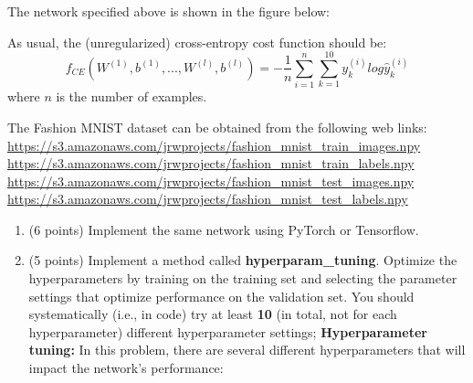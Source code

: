 \documentclass[
  letterpaper,
  DIV=11,
  numbers=noendperiod]{scrartcl}
\begin{document}
The network specified above is shown in the figure below:

As usual, the (unregularized) cross-entropy cost function should be:
\[f_{CE}(W^{(1)},b^{(1)},...,W^{(l)},b^{(l)})=-\frac{1}{n}\sum_{i=1}^{n}\sum_{k=1}^{10}y_{k}^{(i)}log\hat{y}_{k}^{(i)}\]
where \(n\) is the number of examples.

The Fashion MNIST dataset can be obtained from the following web links:
\url{https://s3.amazonaws.com/jrwprojects/fashion_mnist_train_images.npy}
\url{https://s3.amazonaws.com/jrwprojects/fashion_mnist_train_labels.npy}
\url{https://s3.amazonaws.com/jrwprojects/fashion_mnist_test_images.npy}
\url{https://s3.amazonaws.com/jrwprojects/fashion_mnist_test_labels.npy}

\begin{enumerate}
\def\labelenumi{\arabic{enumi}.}
\item
  (6 points) Implement the same network using PyTorch or Tensorflow.
\item
  (5 points) Implement a method called \textbf{hyperparam\_tuning}.
  Optimize the hyperparameters by training on the training set and
  selecting the parameter settings that optimize performance on the
  validation set. You should systematically (i.e., in code) try at least
  \textbf{10} (in total, not for each hyperparameter) different
  hyperparameter settings; \textbf{Hyperparameter tuning:} In this
  problem, there are several different hyperparameters that will impact
  the network's performance:


\end{enumerate}
\end{document}
